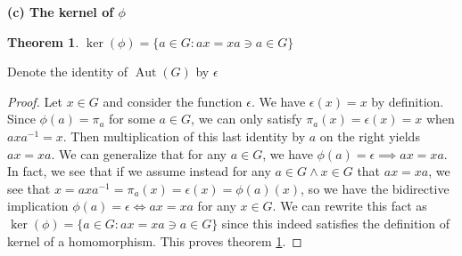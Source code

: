 \documentclass[12pt]{article}
\newcommand{\Aut}{\operatorname{Aut}}
\newtheorem{thm}{Theorem}
\begin{document}
\medskip
\noindent
\textbf{(c) The kernel of $\phi$}

\begin{thm} \label{thm14}
	$\ker(\phi) = \{ a \in G: ax = xa \ni a \in G \}$
\end{thm}

Denote the identity of $\Aut(G)$ by $\epsilon$
\begin{proof}
	Let $x \in G$ and consider the function $\epsilon$.
	We have $\epsilon(x) = x$ by definition.
	Since $\phi(a) = \pi_a$ for some $a \in G$,
	we can only satisfy $\pi_a(x) = \epsilon(x) = x$ when $axa^{-1} = x$.
	Then multiplication of this last identity
	by $a$ on the right yields $ax = xa$.
	We can generalize that for any $a \in G$, we have $\phi(a) = \epsilon \implies ax = xa$.
	In fact, we see that if we assume instead for any $a \in G \land x \in G$
	that $ax = xa$, we see that $x = axa^{-1} = \pi_a(x) = \epsilon(x) = \phi(a)(x)$,
	so we have the bidirective implication $\phi(a) = \epsilon \iff ax = xa$ for any $x \in G$.
	We can rewrite this fact as $\ker(\phi) = \{a \in G: ax = xa \ni a \in G \}$
	since this indeed satisfies the definition of kernel of a homomorphism.
	This proves theorem \ref{thm14}.
\end{proof}
\end{document}
